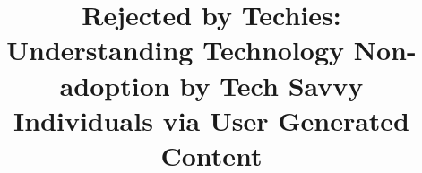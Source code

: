 \documentclass[sigchi, review, anonymous]{acmart}
\begin{document}
\title{Rejected by Techies: Understanding Technology Non-adoption by Tech Savvy Individuals via User Generated Content}








\renewcommand{\shortauthors}{A. Noman et al.}



\end{document}
